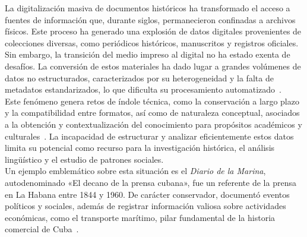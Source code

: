 \introduction

\setlength{\parindent}{0pt} %
\setlength{\parskip}{10pt}  %

La digitalización masiva de documentos históricos ha transformado el acceso a fuentes de información que, durante siglos, permanecieron confinadas a archivos físicos. Este proceso ha generado una explosión de datos digitales provenientes de colecciones diversas, como periódicos históricos, manuscritos y registros oficiales. 
Sin embargo, la transición del medio impreso al digital no ha estado exenta de desafíos. La conversión de estos materiales ha dado lugar a grandes volúmenes de datos no estructurados, caracterizados por su heterogeneidad y la falta de metadatos estandarizados, lo que dificulta su procesamiento automatizado~\cite{lucidea_metadata}.\\
Este fenómeno genera retos de índole técnica, como la conservación a largo plazo y la compatibilidad entre formatos, así como de naturaleza conceptual, asociados a la obtención y contextualización del conocimiento para propósitos académicos y culturales~\cite{lucidea_metadata}. La incapacidad de estructurar y analizar eficientemente estos datos limita su potencial como recurso para la investigación histórica, el análisis lingüístico y el estudio de patrones sociales.\\
Un ejemplo emblemático sobre esta situación es el \textit{Diario de la Marina}, autodenominado «El decano de la prensa cubana», fue un referente de la prensa en La Habana entre 1844 y 1960. De carácter conservador, documentó eventos políticos y sociales, además de registrar información valiosa sobre actividades económicas, como el transporte marítimo, pilar fundamental de la historia comercial de Cuba~\cite{wikipedia_diario}.\\
